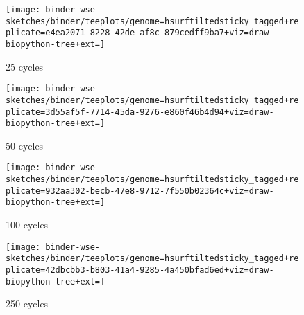 \begin{figure*}

\begin{subfigure}[c]{\textwidth}
\begin{minipage}[c]{0.1\textwidth}
    \caption{25 cycles}
    \label{fig:tagged_25}
  \end{minipage}
  \begin{minipage}[c]{0.9\textwidth}
    \texttt{[image: binder-wse-sketches/binder/teeplots/genome=hsurftiltedsticky\_tagged+replicate=e4ea2071-8228-42de-af8c-879cedff9ba7+viz=draw-biopython-tree+ext=]}
  \end{minipage}
\end{subfigure}

\vspace{-1ex}

\begin{subfigure}[c]{\textwidth}  \begin{minipage}[c]{0.1\textwidth}
    \caption{50 cycles}
    \label{fig:tagged_50}
  \end{minipage}
  \begin{minipage}[c]{0.9\textwidth}
    \texttt{[image: binder-wse-sketches/binder/teeplots/genome=hsurftiltedsticky\_tagged+replicate=3d55af5f-7714-45da-9276-e860f46b4d94+viz=draw-biopython-tree+ext=]}
  \end{minipage}
\end{subfigure}

\vspace{-1ex}

\begin{subfigure}[c]{\textwidth}
  \begin{minipage}[c]{0.1\textwidth}
    \caption{100 cycles}
    \label{fig:tagged_100}
  \end{minipage}
  \begin{minipage}[c]{0.9\textwidth}
    \texttt{[image: binder-wse-sketches/binder/teeplots/genome=hsurftiltedsticky\_tagged+replicate=932aa302-becb-47e8-9712-7f550b02364c+viz=draw-biopython-tree+ext=]}
  \end{minipage}
\end{subfigure}

\vspace{-1ex}

\begin{subfigure}[c]{\textwidth}
  \begin{minipage}[c]{0.1\textwidth}
    \caption{250 cycles}
    \label{fig:tagged_250}
  \end{minipage}
  \begin{minipage}[c]{0.9\textwidth}
    \texttt{[image: binder-wse-sketches/binder/teeplots/genome=hsurftiltedsticky\_tagged+replicate=42dbcbb3-b803-41a4-9285-4a450bfad6ed+viz=draw-biopython-tree+ext=]}
  \end{minipage}
\end{subfigure}


\end{figure*}
